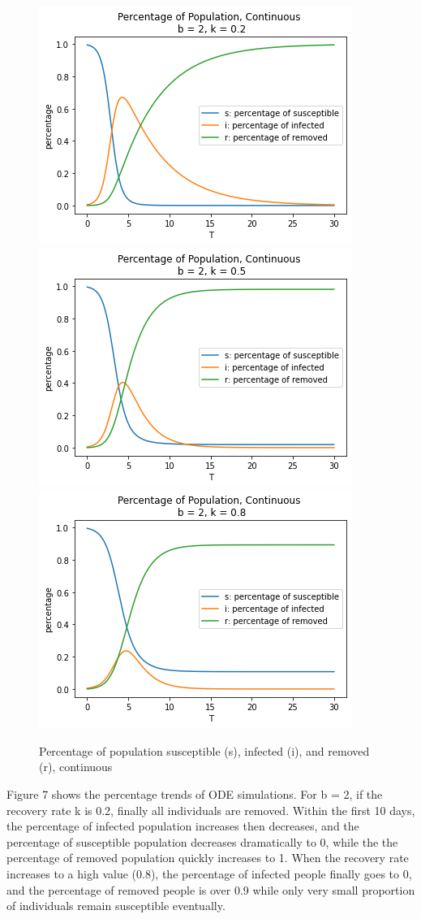 \documentclass{article}
\begin{document}
\begin{figure}[htp]

\centering
\includegraphics[width=.3\textwidth]{Figure2_ode_b2k1.png}\hfill
\includegraphics[width=.3\textwidth]{Figure2_ode_b2k2.png}\hfill
\includegraphics[width=.3\textwidth]{Figure2_ode_b2k3.png}

\caption{Percentage of population susceptible (s), infected (i), and removed (r), continuous}
\label{fig:figure3}

\end{figure}


Figure 7 shows the percentage trends of ODE simulations. For b = 2, if the recovery rate k is 0.2, finally all individuals are removed. Within the first 10 days, the percentage of infected population increases then decreases, and the percentage of susceptible population decreases dramatically to 0, while the the percentage of removed population quickly increases to 1. When the recovery rate increases to a high value (0.8), the percentage of infected people finally goes to 0, and the percentage of removed people is over 0.9 while only very small proportion of individuals remain susceptible eventually.
\end{document}
